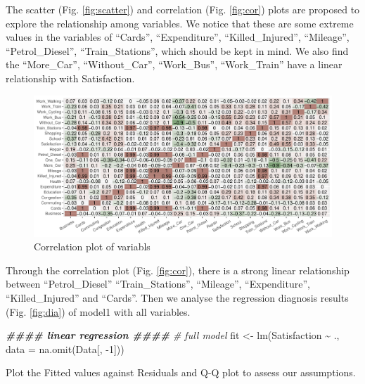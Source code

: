 \documentclass[
]{article}
\newenvironment{Shaded}{\begin{snugshade}}{\end{snugshade}}
\newcommand{\AttributeTok}[1]{\textcolor[rgb]{0.77,0.63,0.00}{#1}}
\newcommand{\CommentTok}[1]{\textcolor[rgb]{0.56,0.35,0.01}{\textit{#1}}}
\newcommand{\DecValTok}[1]{\textcolor[rgb]{0.00,0.00,0.81}{#1}}
\newcommand{\DocumentationTok}[1]{\textcolor[rgb]{0.56,0.35,0.01}{\textbf{\textit{#1}}}}
\newcommand{\FunctionTok}[1]{\textcolor[rgb]{0.00,0.00,0.00}{#1}}
\newcommand{\NormalTok}[1]{#1}
\newcommand{\OtherTok}[1]{\textcolor[rgb]{0.56,0.35,0.01}{#1}}
\newcommand{\SpecialCharTok}[1]{\textcolor[rgb]{0.00,0.00,0.00}{#1}}
\begin{document}
The scatter (Fig. \ref{fig:scatter}) and correlation (Fig.
\ref{fig:cor}) plots are proposed to explore the relationship among
variables. We notice that these are some extreme values in the variables
of ``Cards'', ``Expenditure'', ``Killed\_Injured'', ``Mileage'',
``Petrol\_Diesel'', ``Train\_Stations'', which should be kept in mind.
We also find the ``More\_Car'', ``Without\_Car'', ``Work\_Bus'',
``Work\_Train'' have a linear relationship with Satisfaction.

\begin{figure}

{\centering \includegraphics{RMD-Group-28_files/figure-latex/unnamed-chunk-5-1} 

}

\caption{\label{fig:cor} Correlation plot of variabls}\label{fig:unnamed-chunk-5}
\end{figure}

Through the correlation plot (Fig. \ref{fig:cor}), there is a strong
linear relationship between ``Petrol\_Diesel'' ``Train\_Stations'',
``Mileage'', ``Expenditure'', ``Killed\_Injured'' and ``Cards''. Then we
analyse the regression diagnosis results (Fig. \ref{fig:dia}) of model1
with all variables.

\begin{Shaded}
\begin{Highlighting}[]
\DocumentationTok{\#\#\#\# linear regression \#\#\#\#}
\CommentTok{\# full model}
\NormalTok{fit }\OtherTok{\textless{}{-}} \FunctionTok{lm}\NormalTok{(Satisfaction }\SpecialCharTok{\textasciitilde{}}\NormalTok{ ., }\AttributeTok{data =} \FunctionTok{na.omit}\NormalTok{(Data[, }\SpecialCharTok{{-}}\DecValTok{1}\NormalTok{]))}
\end{Highlighting}
\end{Shaded}

Plot the Fitted values against Residuals and Q-Q plot to assess our
assumptions.
\end{document}
